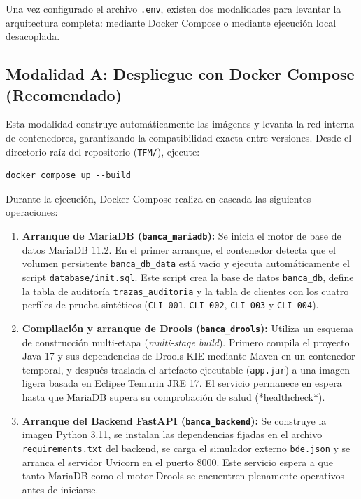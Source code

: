 Una vez configurado el archivo \texttt{.env}, existen dos modalidades para levantar la arquitectura completa: mediante Docker Compose o mediante ejecución local desacoplada.

\subsection{Modalidad A: Despliegue con Docker Compose (Recomendado)}

Esta modalidad construye automáticamente las imágenes y levanta la red interna de contenedores, garantizando la compatibilidad exacta entre versiones. Desde el directorio raíz del repositorio (\texttt{TFM/}), ejecute:

\begin{verbatim}
docker compose up --build
\end{verbatim}

Durante la ejecución, Docker Compose realiza en cascada las siguientes operaciones:

\begin{enumerate}
    \item \textbf{Arranque de MariaDB (\texttt{banca\_mariadb}):} Se inicia el motor de base de datos MariaDB 11.2. En el primer arranque, el contenedor detecta que el volumen persistente \texttt{banca\_db\_data} está vacío y ejecuta automáticamente el script \texttt{database/init.sql}. Este script crea la base de datos \texttt{banca\_db}, define la tabla de auditoría \texttt{trazas\_auditoria} y la tabla de clientes con los cuatro perfiles de prueba sintéticos (\texttt{CLI-001}, \texttt{CLI-002}, \texttt{CLI-003} y \texttt{CLI-004}).
    
    \item \textbf{Compilación y arranque de Drools (\texttt{banca\_drools}):} Utiliza un esquema de construcción multi-etapa (\textit{multi-stage build}). Primero compila el proyecto Java 17 y sus dependencias de Drools KIE mediante Maven en un contenedor temporal, y después traslada el artefacto ejecutable (\texttt{app.jar}) a una imagen ligera basada en Eclipse Temurin JRE 17. El servicio permanece en espera hasta que MariaDB supera su comprobación de salud (*healthcheck*).
    
    \item \textbf{Arranque del Backend FastAPI (\texttt{banca\_backend}):} Se construye la imagen Python 3.11, se instalan las dependencias fijadas en el archivo \texttt{requirements.txt} del backend, se carga el simulador externo \texttt{bde.json} y se arranca el servidor Uvicorn en el puerto 8000. Este servicio espera a que tanto MariaDB como el motor Drools se encuentren plenamente operativos antes de iniciarse.
\end{enumerate}


